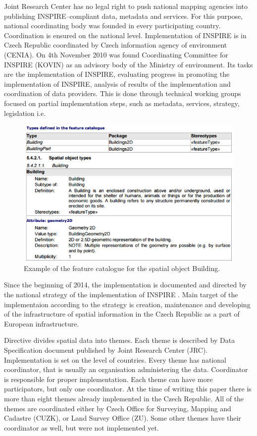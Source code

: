 \documentclass[eprint]{actapoly}
\begin{document}
Joint Research Center has no legal right to push national mapping agencies into publishing INSPIRE--compliant data, metadata and services. For this purpose, national coordinating body was founded in every participating country. Coordination is ensured on the national level. Implementation of INSPIRE is in Czech Republic coordinated by Czech information agency of environment (CENIA). On 4th November 2010 was found Coordinating Committee for INSPIRE (KOVIN) as an advisory body of the Ministry of environment. Its tasks are the implementation of INSPIRE, evaluating progress in promoting the implementation of INSPIRE, analysis of results of the implementation and coordination of data providers. This is done through technical working groups focused on partial implementation steps, such as metadata, services, strategy, legislation i.e.
\cite{KOVIN}

\begin{figure}
\centering
\includegraphics[width=0.8\linewidth]{pics/feature_catalogue.png} %
\caption{Example of the feature catalogue for the spatial object Building.}
\label{fig:feature_catalogue}
\end{figure}

Since the beginning of 2014, the implementation is documented and directed by the national strategy of the implementation of INSPIRE \cite{strategie}. Main target of the implementaion according to the strategy is creation, maintenance and developing of the infrastructure of spatial information in the Czech Republic as a part of European infrastructure.

Directive divides spatial data into themes. Each theme is described by Data Specification document published by Joint Research Center (JRC). Implementation is set on the level of countries. Every theme has national coordinator, that is usually an organisation administering the data. Coordinator is responsible for proper implementation. Each theme can have more participators, but only one coordinator. At the time of writing this paper there is more than eight themes already implemented in the Czech Republic. All of the themes are coordinated either by Czech Office for Surveying, Mapping and Cadastre (CUZK), or Land Survey Office (ZU). Some other themes have their coordinator as well, but were not implemented yet.
\end{document}
